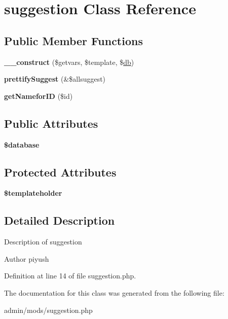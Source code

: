\hypertarget{classsuggestion}{\section{suggestion Class Reference}
\label{classsuggestion}
}
\subsection*{Public Member Functions}
\begin{DoxyCompactItemize}
\item 
\hypertarget{classsuggestion_a54703d24bdf07ef0090a5b2438e3b48e}{{\bfseries \-\_\-\-\_\-construct} (\$getvars, \$template, \$\hyperlink{classdb}{db})}\label{classsuggestion_a54703d24bdf07ef0090a5b2438e3b48e}

\item 
\hypertarget{classsuggestion_a0ceba059ab7df36e05f885ce21f46d97}{{\bfseries prettify\-Suggest} (\&\$allsuggest)}\label{classsuggestion_a0ceba059ab7df36e05f885ce21f46d97}

\item 
\hypertarget{classsuggestion_a0ce24e4d0167eebc3cd7b6b6455d572c}{{\bfseries get\-Namefor\-I\-D} (\$id)}\label{classsuggestion_a0ce24e4d0167eebc3cd7b6b6455d572c}

\end{DoxyCompactItemize}
\subsection*{Public Attributes}
\begin{DoxyCompactItemize}
\item 
\hypertarget{classsuggestion_aae8b40e9d0fc48610b45fed9d9c6a368}{{\bfseries \$database}}\label{classsuggestion_aae8b40e9d0fc48610b45fed9d9c6a368}

\end{DoxyCompactItemize}
\subsection*{Protected Attributes}
\begin{DoxyCompactItemize}
\item 
\hypertarget{classsuggestion_a1968dfa701dab7f607a0a37418d61ca3}{{\bfseries \$templateholder}}\label{classsuggestion_a1968dfa701dab7f607a0a37418d61ca3}

\end{DoxyCompactItemize}


\subsection{Detailed Description}
Description of suggestion

\begin{DoxyAuthor}{Author}
piyush 
\end{DoxyAuthor}


Definition at line 14 of file suggestion.\-php.



The documentation for this class was generated from the following file\-:\begin{DoxyCompactItemize}
\item 
admin/mods/suggestion.\-php\end{DoxyCompactItemize}
